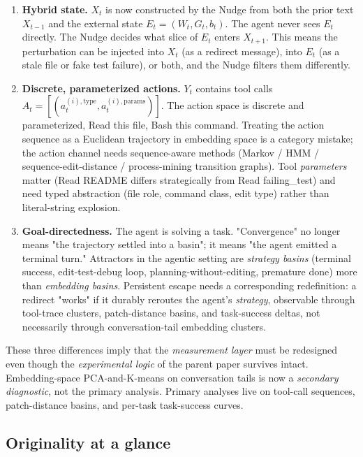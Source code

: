 \documentclass{article}
\theoremstyle{plain}
\theoremstyle{definition}
\begin{document}
\begin{enumerate}
  \item \textbf{Hybrid state.} $X_t$ is now constructed by the Nudge from both the prior text $X_{t-1}$ and the external state $E_t = (W_t, G_t, b_t)$. The agent never sees $E_t$ directly. The Nudge decides what slice of $E_t$ enters $X_{t+1}$. This means the perturbation can be injected into $X_t$ (as a redirect message), into $E_t$ (as a stale file or fake test failure), or both, and the Nudge filters them differently.
  \item \textbf{Discrete, parameterized actions.} $Y_t$ contains tool calls $A_t = [(a_t^{(i),\text{type}}, a_t^{(i),\text{params}})]$. The action space is discrete and parameterized, Read this file, Bash this command. Treating the action sequence as a Euclidean trajectory in embedding space is a category mistake; the action channel needs sequence-aware methods (Markov / HMM / sequence-edit-distance / process-mining transition graphs). Tool \textit{parameters} matter (Read README differs strategically from Read failing\_test) and need typed abstraction (file role, command class, edit type) rather than literal-string explosion.
  \item \textbf{Goal-directedness.} The agent is solving a task. "Convergence" no longer means "the trajectory settled into a basin"; it means "the agent emitted a terminal turn." Attractors in the agentic setting are \textit{strategy basins} (terminal success, edit-test-debug loop, planning-without-editing, premature done) more than \textit{embedding basins}. Persistent escape needs a corresponding redefinition: a redirect "works" if it durably reroutes the agent's \textit{strategy}, observable through tool-trace clusters, patch-distance basins, and task-success deltas, not necessarily through conversation-tail embedding clusters.
\end{enumerate}

These three differences imply that the \textit{measurement layer} must be redesigned even though the \textit{experimental logic} of the parent paper survives intact. Embedding-space PCA-and-K-means on conversation tails is now a \textit{secondary diagnostic}, not the primary analysis. Primary analyses live on tool-call sequences, patch-distance basins, and per-task task-success curves.

\subsection{Originality at a glance}
\end{document}
